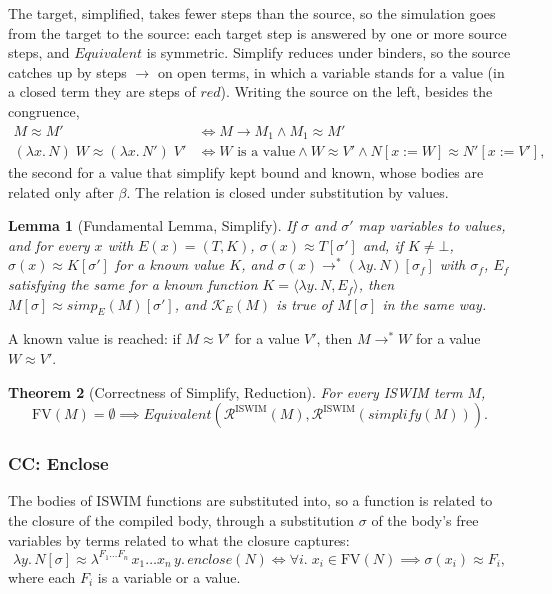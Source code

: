 \documentclass[10pt]{article}
\theoremstyle{acmplain}
\newtheorem{theorem}{Theorem}[section]
\newtheorem{lemma}[theorem]{Lemma}
\newcommand{\pass}[1]{\mathit{#1}}
\newcommand{\lam}[1]{\lambda #1.\,}
\newcommand{\clos}[2]{\lambda^{#1}\, #2.\,}
\newcommand{\FV}{\mathrm{FV}}
\newcommand{\Equiv}{\mathit{Equivalent}}
\begin{document}
The target, simplified, takes fewer steps than the source, so the simulation
goes from the target to the source: each target step is answered by one or
more source steps, and $\Equiv$ is symmetric. Simplify reduces under binders,
so the source catches up by steps $\to$ on open terms, in which a variable
stands for a value (in a closed term they are steps of $\mathit{red}$). Writing
the source on the left, besides the congruence,
\begin{align*}
  M \approx M' &\iff M \to M_1 \land M_1 \approx M' \\
  (\lam{x} N)\;W \approx (\lam{x} N')\;V' &\iff W \text{ is a value} \land W \approx V' \land N[x := W] \approx N'[x := V'] ,
\end{align*}
the second for a value that simplify kept bound and known, whose bodies are
related only after $\beta$. The relation is closed under substitution by values.
\begin{lemma}[Fundamental Lemma, Simplify]
If $\sigma$ and $\sigma'$ map variables to values, and for every $x$ with
$E(x) = (T, K)$, $\sigma(x) \approx T[\sigma']$ and, if $K \neq \bot$,
$\sigma(x) \approx K[\sigma']$ for a known value $K$, and
$\sigma(x) \to^* (\lam{y} N)[\sigma_f]$ with $\sigma_f$, $E_f$ satisfying the same
for a known function $K = \langle \lam{y} N, E_f \rangle$, then
$M[\sigma] \approx \pass{simp}_E(M)[\sigma']$, and $\mathcal{K}_E(M)$ is true of
$M[\sigma]$ in the same way.
\end{lemma}
A known value is reached: if $M \approx V'$ for a value $V'$, then $M \to^* W$
for a value $W \approx V'$.
\begin{theorem}[Correctness of Simplify, Reduction]\label{thm:simplify-red}
For every ISWIM term $M$,
\[
  \FV(M) = \emptyset \implies
  \Equiv(\mathcal{R}^{\mathrm{ISWIM}}(M), \mathcal{R}^{\mathrm{ISWIM}}(\pass{simplify}(M))) .
\]
\end{theorem}

\subsubsection{CC: Enclose}

The bodies of ISWIM functions are substituted into, so a function is related
to the closure of the compiled body, through a substitution $\sigma$ of the
body's free variables by terms related to what the closure captures:
\[
  \lam{y} N[\sigma] \approx \clos{F_1\ldots F_n}{x_1\ldots x_n\, y} \pass{enclose}(N)
  \iff \forall i.\; x_i \in \FV(N) \implies \sigma(x_i) \approx F_i ,
\]
where each $F_i$ is a variable or a value.
\end{document}
